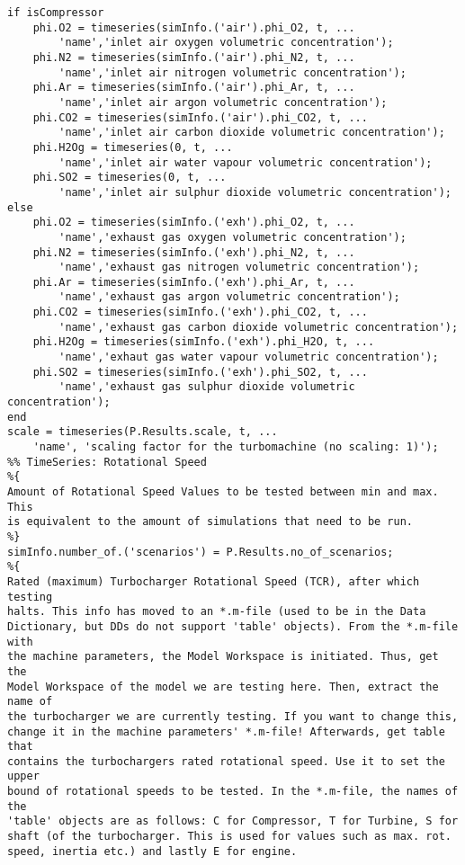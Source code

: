 \begin{lstlisting}
if isCompressor
    phi.O2 = timeseries(simInfo.('air').phi_O2, t, ...
        'name','inlet air oxygen volumetric concentration');
    phi.N2 = timeseries(simInfo.('air').phi_N2, t, ...
        'name','inlet air nitrogen volumetric concentration');
    phi.Ar = timeseries(simInfo.('air').phi_Ar, t, ...
        'name','inlet air argon volumetric concentration');
    phi.CO2 = timeseries(simInfo.('air').phi_CO2, t, ...
        'name','inlet air carbon dioxide volumetric concentration');
    phi.H2Og = timeseries(0, t, ...
        'name','inlet air water vapour volumetric concentration');
    phi.SO2 = timeseries(0, t, ...
        'name','inlet air sulphur dioxide volumetric concentration');
else
    phi.O2 = timeseries(simInfo.('exh').phi_O2, t, ...
        'name','exhaust gas oxygen volumetric concentration');
    phi.N2 = timeseries(simInfo.('exh').phi_N2, t, ...
        'name','exhaust gas nitrogen volumetric concentration');
    phi.Ar = timeseries(simInfo.('exh').phi_Ar, t, ...
        'name','exhaust gas argon volumetric concentration');
    phi.CO2 = timeseries(simInfo.('exh').phi_CO2, t, ...
        'name','exhaust gas carbon dioxide volumetric concentration');
    phi.H2Og = timeseries(simInfo.('exh').phi_H2O, t, ...
        'name','exhaut gas water vapour volumetric concentration');
    phi.SO2 = timeseries(simInfo.('exh').phi_SO2, t, ...
        'name','exhaust gas sulphur dioxide volumetric concentration');    
end
scale = timeseries(P.Results.scale, t, ...
    'name', 'scaling factor for the turbomachine (no scaling: 1)');
%% TimeSeries: Rotational Speed
%{
Amount of Rotational Speed Values to be tested between min and max. This
is equivalent to the amount of simulations that need to be run.
%}
simInfo.number_of.('scenarios') = P.Results.no_of_scenarios;
%{
Rated (maximum) Turbocharger Rotational Speed (TCR), after which testing
halts. This info has moved to an *.m-file (used to be in the Data
Dictionary, but DDs do not support 'table' objects). From the *.m-file with
the machine parameters, the Model Workspace is initiated. Thus, get the
Model Workspace of the model we are testing here. Then, extract the name of
the turbocharger we are currently testing. If you want to change this,
change it in the machine parameters' *.m-file! Afterwards, get table that
contains the turbochargers rated rotational speed. Use it to set the upper
bound of rotational speeds to be tested. In the *.m-file, the names of the
'table' objects are as follows: C for Compressor, T for Turbine, S for
shaft (of the turbocharger. This is used for values such as max. rot.
speed, inertia etc.) and lastly E for engine.

\end{lstlisting}
